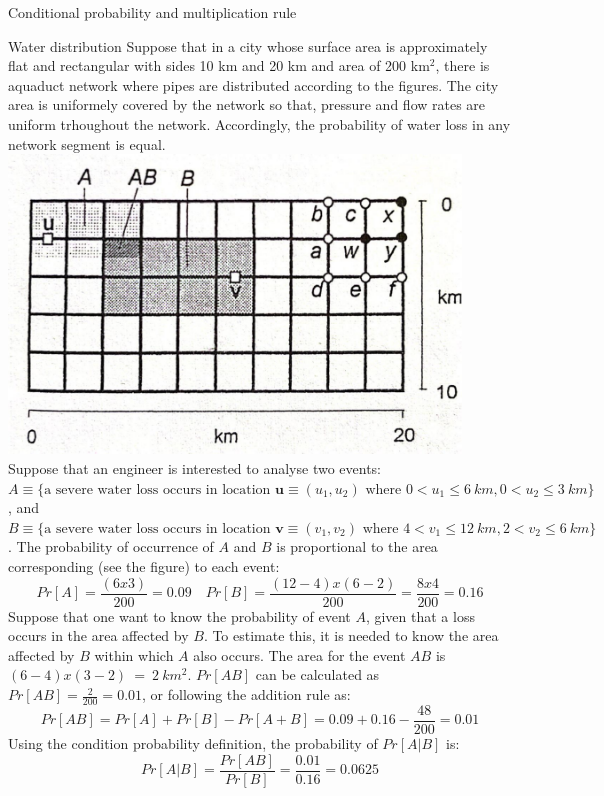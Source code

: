 \documentclass[8pt]{beamer}
\begin{document}
\begin{frame}{Conditional probability and multiplication rule}
    \begin{exampleblock}{Water distribution}
        Suppose that in a city whose surface area is approximately flat and rectangular with sides 10 km and 20 km and area of 200 km$^2$, there is aquaduct network where pipes are distributed according to the figures. The city area is uniformely covered by the network so that, pressure and flow rates are uniform trhoughout the network. Accordingly, the probability of water loss in any network segment is equal. 
        \includegraphics[width=0.9\textwidth]{fi223.jpeg}
        Suppose that an engineer is interested to analyse two events: $A \equiv \{ \text{a severe water loss occurs in location } \mathbf{u} \equiv (u_1 , u_2) \text{ where } 0 < u_1 \leq 6 \ km, 0 < u_2 \leq 3 \ km\}$, and   $B \equiv \{ \text{a severe water loss occurs in location } \mathbf{v} \equiv (v_1 , v_2) \text{ where } 4 < v_1 \leq 12 \ km, 2 < v_2 \leq 6 \ km\}$. The probability of occurrence of $A$ and $B$ is proportional to the area corresponding  (see the figure) to each event:
        $$
        Pr[A] = \frac{(6 x 3)}{200} = 0.09 \quad Pr[B] = \frac{(12 - 4) x (6 - 2)}{200} = \frac{8 x 4}{200} = 0.16
        $$
        Suppose that one want to know the probability of event $A$, given that a loss occurs in the area affected by $B$. To estimate this, it is needed to know the area affected by $B$ within which $A$ also occurs. The area for the event $AB$ is $(6 - 4) x (3 - 2) \ = \ 2 \ km^2 $. $Pr[AB]$ can be calculated as $Pr[AB] = \frac{2}{200} = 0.01$, or following the addition rule as:
$$
Pr[AB] = Pr[A] + Pr[B] - Pr[A + B] = 0.09 + 0.16 - \frac{48}{200} = 0.01
$$
Using the condition probability definition, the probability of $Pr[A | B]$ is:
    $$
    Pr[A | B] = \frac{Pr[AB]}{Pr[B]} = \frac{0.01}{0.16} = 0.0625
    $$
    \end{exampleblock}
\end{frame}
\end{document}
